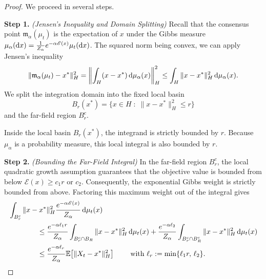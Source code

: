 \documentclass[12pt]{amsart}
\newcommand{\D}[1]{\mbox{\rm #1}}
\newcommand{\dd}{\D{d}}
\numberwithin{equation}{section}
\begin{document}
\begin{proof}
We proceed in several steps. 

\textbf{Step 1.} \textit{(Jensen's Inequality and Domain Splitting)} 
Recall that the consensus point $\mathfrak{m}_{\alpha}(\mu_t)$ is the expectation of $x$ under the Gibbs measure $\mu_\alpha(\dd x) = \frac{1}{Z_\alpha} e^{-\alpha \mathscr{E}(x)} \mu_t(\dd x)$. The squared norm being convex, we can apply Jensen's inequality
\begin{equation} \label{eq:jensen_split_deg}
    \|\mathfrak{m}_{\alpha}(\mu_t) - x^*\|_H^2 = \left\| \int_H (x - x^*)\, \dd \mu_\alpha(x) \right\|_H^2 \leq \int_H \|x - x^*\|_H^2 \, \dd \mu_\alpha(x).
\end{equation}
We split the integration domain into the fixed local basin 
\[
B_r(x^*) = \{x \in H \;:\; \|x - x^*\|_H^2 \leq r\}
\]
and the far-field region $B_r^c$. 

Inside the local basin $B_r(x^*)$, the integrand is strictly bounded by $r$. Because $\mu_\alpha$ is a probability measure, this local integral is also bounded by $r$.

\textbf{Step 2.} \textit{(Bounding the Far-Field Integral)} 
In the far-field region $B_r^c$, the local quadratic growth assumption guarantees that the objective value is bounded from below $\mathscr{E}(x) \geq c_1 r$ or $c_2$. Consequently, the exponential Gibbs weight is strictly bounded from above. Factoring this maximum weight out of the integral gives 
\begin{equation}
 \label{eq:far_field_bound_deg}
\begin{aligned}
    &\int_{B_r^c} \|x - x^*\|_H^2 \frac{e^{-\alpha \mathscr{E}(x)}}{Z_\alpha} \,\dd\mu_t(x) \\
    & \qquad \qquad \leq \frac{e^{-\alpha \ell_1 r}}{Z_\alpha} \int_{B_r^c\cap B_R} \|x - x^*\|_H^2 \,\dd\mu_t(x)+ \frac{e^{-\alpha \ell_2}}{Z_\alpha} \int_{B_r^c\cap B_R^c} \|x - x^*\|_H^2 \,\dd\mu_t(x) \\
    & \qquad \qquad \leq \frac{e^{-\alpha \ell_r}}{Z_\alpha} \mathbb{E}\big[\|X_t - x^*\|_H^2\big] \qquad \text{ with } \ell_r:=\min\{\ell_{1}r,\,\ell_2\}.
\end{aligned}
\end{equation}


\end{proof}
\end{document}
